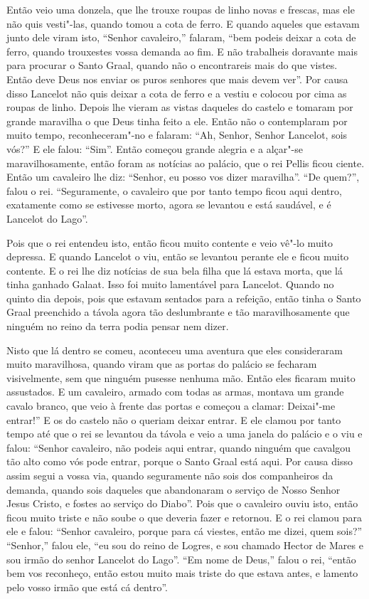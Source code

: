 Então veio uma donzela, que lhe trouxe roupas de linho novas e frescas, mas ele
não quis vesti"-las, quando tomou a cota de ferro. E quando aqueles que estavam
junto dele viram isto, “Senhor cavaleiro,” falaram, “bem podeis deixar a cota
de ferro, quando trouxestes vossa demanda ao fim. E não trabalheis doravante
mais para procurar o Santo Graal, quando não o encontrareis mais do que vistes.
Então deve Deus nos enviar os puros senhores que mais devem ver”. Por causa
disso Lancelot não quis deixar a cota de ferro e a vestiu e colocou por cima
as roupas de linho. Depois lhe vieram as vistas daqueles do castelo e tomaram
por grande maravilha o que Deus tinha feito a ele. Então não o contemplaram por
muito tempo, reconheceram"-no e falaram: “Ah, Senhor, Senhor Lancelot, sois
vós?” E ele falou: “Sim”. Então começou grande alegria e a alçar"-se
maravilhosamente, então foram as notícias ao palácio, que o rei Pellis ficou
ciente. Então um cavaleiro lhe diz: “Senhor, eu posso vos dizer maravilha”. “De
quem?”, falou o rei. “Seguramente, o cavaleiro que por tanto tempo ficou aqui
dentro, exatamente como se estivesse morto, agora se levantou e está saudável,
e é Lancelot do Lago”.

Pois que o rei entendeu isto, então ficou muito contente e veio vê"-lo muito
depressa. E quando Lancelot o viu, então se levantou perante ele e ficou muito
contente. E o rei lhe diz notícias de sua bela filha que lá estava morta, que
lá tinha ganhado Galaat. Isso foi muito lamentável para Lancelot. Quando no
quinto dia depois, pois que estavam sentados para a refeição, então tinha o
Santo Graal preenchido a távola agora tão deslumbrante e tão maravilhosamente
que ninguém no reino da terra podia pensar nem dizer. 

Nisto que lá dentro se comeu, aconteceu uma aventura que eles consideraram muito
maravilhosa, quando viram que as portas do palácio se fecharam visivelmente,
sem que ninguém pusesse nenhuma mão. Então eles ficaram muito assustados. E um
cavaleiro, armado com todas as armas, montava um grande cavalo branco, que veio
à frente das portas e começou a clamar: Deixai"-me entrar!” E os do castelo não
o queriam deixar entrar. E ele clamou por tanto tempo até que o rei se levantou
da távola e veio a uma janela do palácio e o viu e falou: “Senhor cavaleiro,
não podeis aqui entrar, quando ninguém que cavalgou tão alto como vós pode
entrar, porque o Santo Graal está aqui. Por causa disso assim segui a vossa
via, quando seguramente não sois dos companheiros da demanda, quando sois
daqueles que abandonaram o serviço de Nosso Senhor Jesus Cristo, e fostes ao
serviço do Diabo”. Pois que o cavaleiro ouviu isto, então ficou muito triste e
não soube o que deveria fazer e retornou. E o rei clamou para ele e falou:
“Senhor cavaleiro, porque para cá viestes, então me dizei, quem sois?”
“Senhor,” falou ele, “eu sou do reino de Logres, e sou chamado Hector de Mares
e sou irmão do senhor Lancelot do Lago”. “Em nome de Deus,” falou o rei,
“então bem vos reconheço, então estou muito mais triste do que estava antes, e
lamento pelo vosso irmão que está cá dentro”. 

